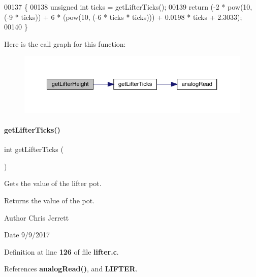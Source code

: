 \begin{DoxyCode}
00137                          \{
00138   \textcolor{keywordtype}{unsigned} \textcolor{keywordtype}{int} ticks = getLifterTicks();
00139   \textcolor{keywordflow}{return} (-2 * pow(10, (-9 * ticks)) + 6 * (pow(10, (-6 * ticks * ticks))) + 0.0198 * ticks + 2.3033);
00140 \}
\end{DoxyCode}
Here is the call graph for this function\+:\nopagebreak
\begin{figure}[H]
\begin{center}
\leavevmode
\includegraphics[width=350pt]{lifter_8h_a2719740958fd8a5926f88f6194e820e3_cgraph}
\end{center}
\end{figure}
\mbox{\label{lifter_8h_acdf909159b0406c48099843f2306be78}} 
\paragraph{get\+Lifter\+Ticks()}
{\footnotesize\ttfamily int get\+Lifter\+Ticks (\begin{DoxyParamCaption}{ }\end{DoxyParamCaption})}



Gets the value of the lifter pot. 

\begin{DoxyReturn}{Returns}
the value of the pot. 
\end{DoxyReturn}
\begin{DoxyAuthor}{Author}
Chris Jerrett 
\end{DoxyAuthor}
\begin{DoxyDate}{Date}
9/9/2017 
\end{DoxyDate}


Definition at line \textbf{ 126} of file \textbf{ lifter.\+c}.



References \textbf{ analog\+Read()}, and \textbf{ L\+I\+F\+T\+ER}.




